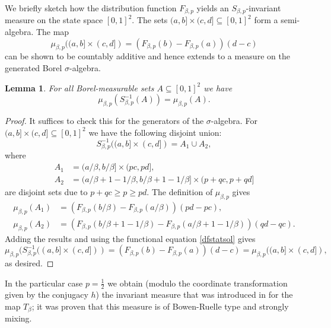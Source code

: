 \documentclass[12pt]{amsart}
\newtheorem{lemma}[theorem]{Lemma}
\theoremstyle{definition}
\theoremstyle{remark}
\numberwithin{equation}{section}
\begin{document}
We briefly sketch how the distribution function $F_{\beta,p}$ yields an $S_{\beta,p}$-invariant measure on the state space $[0,1]^2$. The sets $(a,b] \times (c,d] \subseteq [0,1]^2$ form a semi-algebra. The map
\[
\mu_{\beta,p}((a,b] \times (c,d]) = (F_{\beta,p}(b)-F_{\beta,p}(a))(d-c)
\]
can be shown to be countably additive and hence extends to a measure on the generated Borel $\sigma$-algebra.

\begin{lemma}
For all Borel-measurable sets $A \subseteq [0,1]^2$ we have
\[
\mu_{\beta,p}(S_{\beta,p}^{-1}(A)) = \mu_{\beta,p}(A).
\]
\end{lemma}

\begin{proof}
It suffices to check this for the generators of the $\sigma$-algebra. For $(a,b] \times (c,d] \subseteq [0,1]^2$ we have the following disjoint union:
\[
S_{\beta,p}^{-1}( (a,b] \times (c,d] ) = A_1 \cup A_2,
\]
where
\[
\begin{split}
A_1 & = (a/\beta, b/\beta] \times (pc, pd], \\
A_2 & = (a/\beta+1-1/\beta,b/\beta+1-1/\beta] \times (p+qc, p+qd]
\end{split}
\]
are disjoint sets due to $p+qc\geq p\geq pd$. The definition of $\mu_{\beta,p}$ gives
\[
\begin{split}
	\mu_{\beta,p}(A_1) & = (F_{\beta,p}(b/\beta) - F_{\beta,p}(a/\beta))(pd-pc), \\
	\mu_{\beta,p}(A_2) & = (F_{\beta,p}(b/\beta+1-1/\beta) - F_{\beta,p}(a/\beta+1-1/\beta))(qd-qc).
\end{split}
\]
Adding the results and using the functional equation \eqref{dfstatsol} gives
\[
\mu_{\beta,p}(S_{\beta,p}^{-1}( (a,b] \times (c,d] ))
	= (F_{\beta,p}(b) - F_{\beta,p}(a))(d-c)
	= \mu_{\beta,p}((a,b]\times (c,d]),
\]
as desired.
\end{proof}

In the particular case $p=\frac{1}{2}$ we obtain (modulo the coordinate transformation given by the conjugacy $h$) the invariant measure that was introduced in \cite{AY} for the map $T_\beta$; it was proven that this measure is of Bowen-Ruelle type and strongly mixing.
\end{document}
